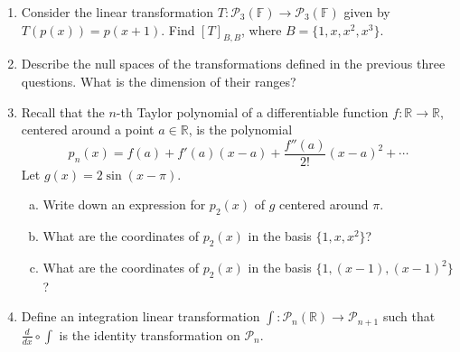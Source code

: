 \documentclass[a4paper,11pt]{article}
\theoremstyle{definition}
\begin{document}
\begin{enumerate}[(1)]
\item
  Consider the linear transformation $T:\mathcal P_3(\mathbb F)\to\mathcal P_3(\mathbb F)$ given by
  $T(p(x)) = p(x+1)$. Find $[T]_{B,B}$, where $B=\{1,x,x^2,x^3\}$.

\item 
Describe the null spaces of the transformations defined in the previous three questions.
What is the dimension of their ranges?


\item
Recall that the $n$-th Taylor polynomial of a differentiable function $f:\mathbb R\to\mathbb R$, centered around a point $a\in \mathbb R$, is the polynomial
\[
p_n(x) = f(a)+f'(a)(x-a)+\frac{f''(a)}{2!}(x-a)^2+\cdots
\]
Let $g(x) = 2\sin(x-\pi)$.
\begin{enumerate}[(a)]
    \item
    Write down an expression for $p_2(x)$ of $g$ centered around $\pi$.
    \item
    What are the coordinates of $p_2(x)$ in the basis $\{1,x,x^2\}$?
    \item 
    What are the coordinates of $p_2(x)$ in the basis $\{1,(x-1),(x-1)^2\}$?    
\end{enumerate}
\item 
Define an integration linear transformation $\int:\mathcal P_n(\mathbb R)\to \mathcal P_{n+1}$ such that $\frac{d}{dx}\circ\int $ is the identity transformation on $\mathcal P_n$.

\end{enumerate}
\end{document}
